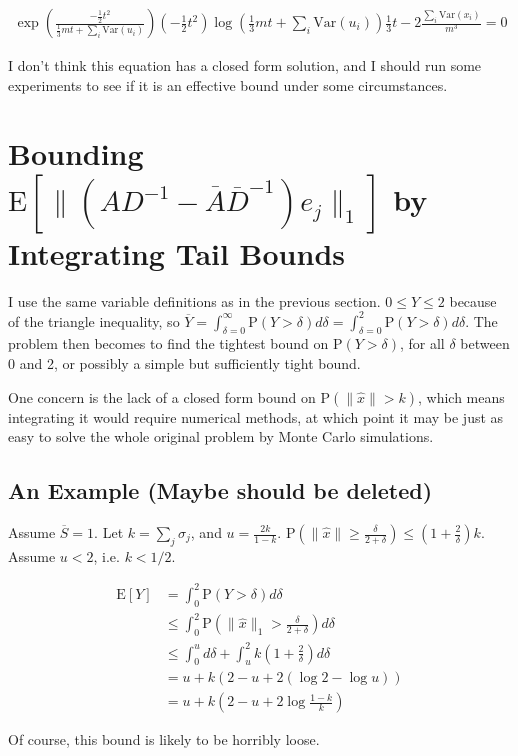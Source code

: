 \documentclass{article}
\newcommand \E[1] {\mathrm E \left[#1\right]} %
\newcommand \Var[1] {\mathrm {Var} \left(#1\right)} %
\newcommand \p[1] {\mathrm P \left(#1\right)}
\newcommand \inv [1] {{#1}^{-1}} %
\begin{document}
\begin{align*}
\exp\left(\frac{-\frac 1 2 t^2}{\frac 1 3 m t + \sum_i \Var{u_i}}\right)\left(-\frac 1 2 t^2\right)\log\left({\frac 1 3 m t + \sum_i \Var{u_i}}\right)\frac 1 3 t - 2 \frac{\sum_i \Var{x_i}}{m^3} = 0
\end{align*}

I don't think this equation has a closed form solution, and I should run some experiments to see if it is an effective bound under some circumstances.

\section{Bounding $\E{\|(A\inv D - \overline A\inv{\overline D})e_j\|_1}$ by Integrating Tail Bounds}

I use the same variable definitions as in the previous section. $0\leq Y\leq 2$ because of the triangle inequality, so $\overline Y = \int_{\delta=0}^\infty \p{Y > \delta} d\delta = \int_{\delta=0}^2 \p{Y>\delta}d\delta$. The problem then becomes to find the tightest bound on $\p{Y>\delta}$, for all $\delta$ between 0 and 2, or possibly a simple but sufficiently tight bound.

One concern is the lack of a closed form bound on $\p{\|\hat x\|>k}$, which means integrating it would require numerical methods, at which point it may be just as easy to solve the whole original problem by Monte Carlo simulations.

\subsection{An Example (Maybe should be deleted)}

Assume $\overline S=1$. Let $k=\sum_j \sigma_j$, and $u=\frac{2k}{1-k}$. $\p{\|\hat x\|\geq\frac\delta{2+\delta}} \leq (1+\frac 2 \delta)k$. Assume $u < 2$, i.e. $k<1/2$.

\begin{align*}
\E{Y} &= \int_0^2 \p{Y > \delta} d\delta \\
&\leq \int_0^2 \p{\|\hat x\|_1>\frac\delta{2+\delta}} d\delta \\
&\leq \int_0^u d\delta + \int_u^2 k\left(1+\frac 2\delta\right)d\delta \\
&= u + k(2-u+2(\log 2-\log u)) \\
&= u+k\left(2-u+2\log{\frac{1-k}k}\right)
\end{align*}

Of course, this bound is likely to be horribly loose.
\end{document}

